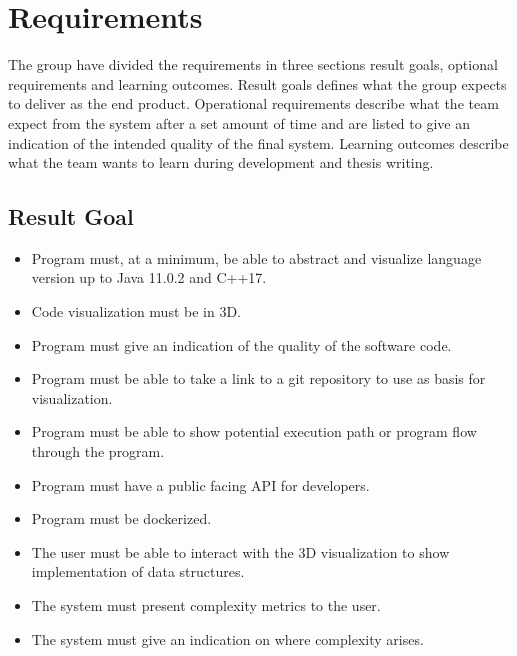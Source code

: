 \chapter{Requirements}
\label{chap:requirements}

The group have divided the requirements in three sections result goals, optional requirements and learning outcomes. Result goals defines what the group expects to deliver as the end product. Operational requirements describe what the team expect from the system after a set amount of time and are listed to give an indication of the intended quality of the final system. Learning outcomes describe what the team wants to learn during development and thesis writing.

\section{Result Goal}
    \begin{itemize}
        \item Program must, at a minimum, be able to abstract and visualize language version up to Java 11.0.2 and C++17.
        \item Code visualization must be in 3D.
        \item Program must give an indication of the quality of the software code.  
        \item Program must be able to take a link to a git repository to use as basis for visualization.
        \item Program must be able to show potential execution path or program flow through the program.
        \item Program must have a public facing API for developers.
        \item Program must be dockerized. 
        \item The user must be able to interact with the 3D visualization to show implementation of data structures.
        \item The system must present complexity metrics to the user.
        \item The system must give an indication on where complexity arises.
    \end{itemize}
    
